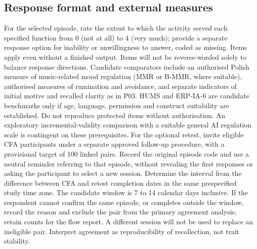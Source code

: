 \subsection{Response format and external measures}
For the selected episode, rate the extent to which the activity served each specified function from 0 (not at all) to 4 (very much); provide a separate response option for inability or unwillingness to answer, coded as missing. Items apply even without a finished output. Items will not be reverse-worded solely to balance response directions. Candidate comparators include an authorised Polish measure of music-related mood regulation (MMR or B-MMR, where suitable), authorised measures of rumination and avoidance, and separate indicators of initial motive and recalled clarity as in P03. HUMS and ERP-IA-6 are candidate benchmarks only if age, language, permission and construct suitability are established. Do not reproduce protected items without authorisation. An exploratory incremental-validity comparison with a suitable general AI regulation scale is contingent on these prerequisites. For the optional retest, invite eligible CFA participants under a separate approved follow-up procedure, with a provisional target of 100 linked pairs. Record the original episode code and use a neutral reminder referring to that episode, without revealing the first responses or asking the participant to select a new session. Determine the interval from the difference between CFA and retest completion dates in the same prespecified study time zone. The candidate window is 7 to 14 calendar days inclusive. If the respondent cannot confirm the same episode, or completes outside the window, record the reason and exclude the pair from the primary agreement analysis; retain counts for the flow report. A different session will not be used to replace an ineligible pair. Interpret agreement as reproducibility of recollection, not trait stability.

